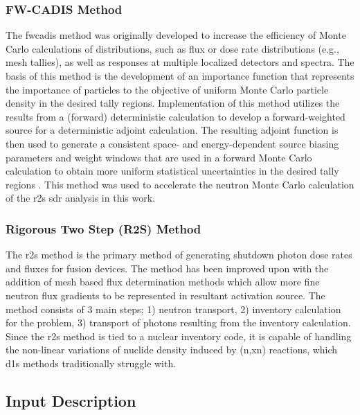 \documentclass[12pt]{article}
\begin{document}
\subsubsection{FW-CADIS Method}
The \gls{fwcadis} method was originally developed to increase the efficiency of 
Monte Carlo calculations of distributions, such as flux or dose rate 
distributions (e.g., mesh tallies), as well as responses at multiple localized 
detectors and spectra. The basis of this method is the development of an 
importance function that represents the importance of particles to the objective
 of uniform Monte Carlo particle density in the desired tally regions. 
Implementation of this method utilizes the results from a (forward) 
deterministic calculation to develop a forward-weighted source for a 
deterministic adjoint calculation. The resulting adjoint function is 
then used to generate a consistent space- and energy-dependent source 
biasing parameters and weight windows that are used in a forward Monte 
Carlo calculation to obtain more uniform statistical uncertainties in the 
desired tally regions \cite{wagnerNSEFWCADIS} . This method was used to 
accelerate the neutron Monte Carlo calculation of the \gls{r2s} \gls{sdr} 
 analysis in this work.
\subsubsection{Rigorous Two Step (R2S) Method}
The \gls{r2s} method \cite{r2s} is the primary method of generating shutdown
photon dose rates and fluxes for fusion devices. The method has been improved
upon with the addition of mesh based flux determination methods
\cite{mcr2s,r2smesh,r2suned,pyne_r2s} which allow more fine neutron flux
gradients to be represented in resultant activation source. The method consists
of 3 main steps; 1) neutron transport, 2) inventory calculation for the problem,
3) transport of photons resulting from the inventory calculation. Since the
\gls{r2s} method is tied to a nuclear inventory code, it is capable of handling
the non-linear variations of nuclide density induced by (n,xn) reactions, which
\gls{d1s} methods traditionally struggle with.
\subsection{Input Description}
\end{document}
